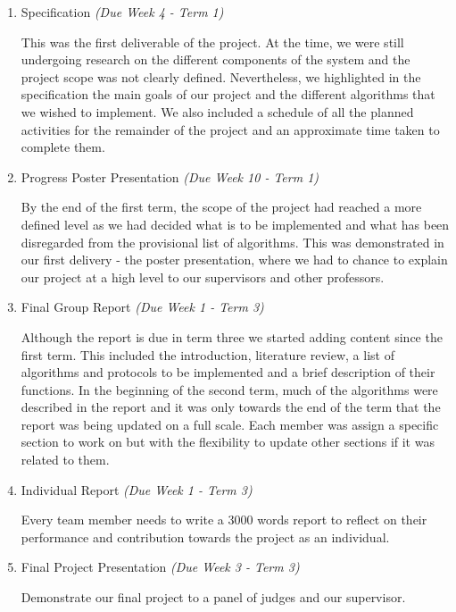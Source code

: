 \begin{enumerate}
	\item Specification \emph{(Due Week 4 - Term 1)}
	
	This was the first deliverable of the project. At the time, we were still undergoing research on the different components of the system and the project scope was not clearly defined. Nevertheless, we highlighted in the specification the main goals of our project and the different algorithms that we wished to implement. We also included a schedule of all the planned activities for the remainder of the project and an approximate time taken to complete them.
	
    \item Progress Poster Presentation \emph{(Due Week 10 - Term 1)}
    
	By the end of the first term, the scope of the project had reached a more defined level as we had decided what is to be implemented and what has been disregarded from the provisional list of algorithms. This was demonstrated in our first delivery - the poster presentation, where we had to chance to explain our project at a high level to our supervisors and other professors.
    
    \item Final Group Report \emph{(Due Week 1 - Term 3)}
    
	Although the report is due in term three we started adding content since the first term. This included the introduction, literature review, a list of algorithms and protocols to be implemented and a brief description of their functions. In the beginning of the second term, much of the algorithms were described in the report and it was only towards the end of the term that the report was being updated on a full scale. Each member was assign a specific section to work on but with the flexibility to update other sections if it was related to them.
	
    \item Individual Report \emph{(Due Week 1 - Term 3)}
    
	Every team member needs to write a 3000 words report to reflect on their performance and contribution towards the project as an individual.
    
    \item Final Project Presentation \emph{(Due Week 3 - Term 3)}
    
    Demonstrate our final project to a panel of judges and our supervisor.
 
\end{enumerate}

